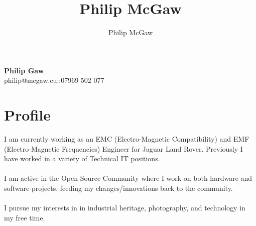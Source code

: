 \documentclass[a4paper]{article}
\title{Philip McGaw}
\author{Philip McGaw}
\date{}
\makeatletter
\newcommand{\Mc}{}
\DeclareRobustCommand{\Mc}{%
  M%
  \raisebox{\dimexpr\fontcharht\font`M-\height}{%
    \check@mathfonts\fontsize{\sf@size}{0}\selectfont
    \underline{c}%
  }%
}
\newcommand{\name}{Philip \Mc Gaw}
\newcommand{\email}{philip@mcgaw.eu}
\newcommand{\phone}{07969 502 077}
\makeatother
\begin{document}
\begin{center}
    {\bfseries\Huge\name} \\
    \email\hspace{1em}::\hspace{1em}\phone
\end{center}

\section{Profile}
I am currently working as an EMC (Electro-Magnetic Compatibility) and EMF (Electro-Magnetic Frequencies) Engineer for Jaguar Land Rover. Previously I have worked in a variety of Technical IT positions. \\ \\
I am active in the Open Source Community where I work on both hardware and software projects, feeding my changes/innovations back to the community.\\ \\
I pursue my interests in in industrial heritage, photography, and technology in my free time.
\end{document}
